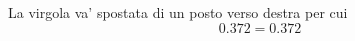 	La virgola va' spostata di un posto verso destra per cui
	\[\num{0.372}=\num[scientific-notation=true]{0.372}\]
